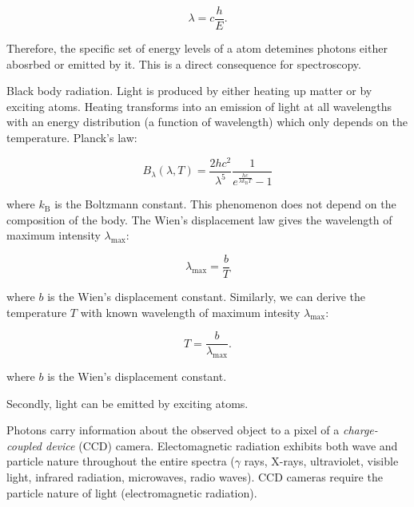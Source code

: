 \begin{equation}
	\lambda = c \frac{h}{E}.
\end{equation}

Therefore, the specific set of energy levels of a atom detemines photons either abosrbed or emitted by it.
This is a direct consequence for spectroscopy.~\cite{cochard2018}

Black body radiation.
Light is produced by either heating up matter or by exciting atoms.
Heating transforms into an emission of light at all wavelengths with an energy distribution (a function of wavelength) which only depends on the temperature.
Planck's law:

\begin{equation}
	B_{\lambda}(\lambda, T) = \frac{2 h c^2}{\lambda^5} \frac{1}{e^{\frac{hc}{\lambda k_{\mathrm{B}}T}} - 1}
\end{equation}

where \(k_{\mathrm{B}}\) is the Boltzmann constant.
This phenomenon does not depend on the composition of the body.
The Wien's displacement law gives the wavelength of maximum intensity \(\lambda_{\max}\):

\begin{equation}
	\lambda_{\max} = \frac{b}{T}
\end{equation}

where \(b\) is the Wien's displacement constant.
Similarly, we can derive the temperature \(T\) with known wavelength of maximum intesity \(\lambda_{\max}\):

\begin{equation}
	T = \frac{b}{\lambda_{\max}}.
\end{equation}

where \(b\) is the Wien's displacement constant.~\cite{cochard2018}

Secondly, light can be emitted by exciting atoms.

Photons carry information about the observed object to a pixel of a \textit{charge-coupled device} (CCD) camera.
Electomagnetic radiation exhibits both wave and particle nature throughout the entire spectra
(\(\gamma\) rays, X-rays, ultraviolet, visible light, infrared radiation, microwaves, radio waves).
CCD cameras require the particle nature of light (electromagnetic radiation).~\cite{trypsteen2017}

